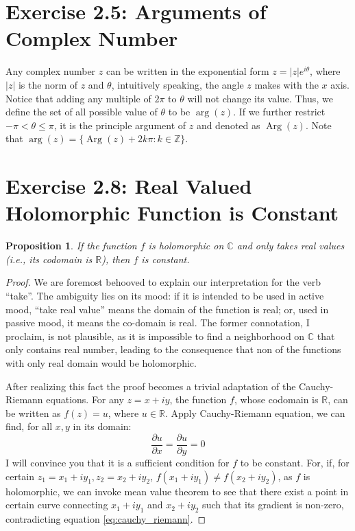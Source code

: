 \documentclass[a4paper,11pt]{article}
\newtheorem{prop}{Proposition}
\DeclareMathOperator{\Arg}{Arg} %
\begin{document}
\section*{Exercise 2.5: Arguments of Complex Number}

Any complex number $z$ can be written in the exponential form $z = |z|e^{i\theta}$, where $|z|$ is the norm of $z$ and $\theta$, intuitively speaking, the angle $z$ makes with the $x$ axis.
Notice that adding any multiple of $2\pi$ to $\theta$ will not change its value. Thus, we define the set of all possible value of $\theta$ to be $\arg(z)$. If we further restrict $-\pi<\theta \leq \pi$, it is the principle argument of $z$ and denoted as $\Arg(z)$. Note that $\arg(z) = \{\Arg(z) + 2k\pi : k \in \mathbb{Z}\}$.

\section*{Exercise 2.8: Real Valued Holomorphic Function is Constant}

\begin{prop}
	If the function $f$ is holomorphic on $\mathbb{C}$ and only takes real values (i.e., its codomain is $\mathbb{R}$), then $f$ is constant.
\end{prop}

\begin{proof}
	We are foremost behooved to explain our interpretation for the verb ``take''.
	The ambiguity lies on its mood: if it is intended to be used in active mood, ``take real value'' means the domain of the function is real; or, used in passive mood, it means the co-domain is real. The former connotation, I proclaim, is not plausible, as it is impossible to find a neighborhood on $\mathbb{C}$ that only contains real number, leading to the consequence that non of the functions with only real domain would be holomorphic.

	After realizing this fact the proof becomes a trivial adaptation of the Cauchy-Riemann equations. 
	For any $z = x + iy$, the function $f$, whose codomain is $\mathbb{R}$, can be written as $f(z) = u$, where $u \in \mathbb{R}$.
	Apply Cauchy-Riemann equation, we can find, for all $x, y$ in its domain: 
	\begin{equation}\label{eq:cauchy_riemann}
		\frac{\partial u}{\partial x} = \frac{\partial u}{\partial y} = 0
	\end{equation}
	I will convince you that it is a sufficient condition for $f$ to be constant.
	For, if, for certain $z_1 = x_1+iy_1, z_2 = x_2+iy_2$, $f(x_1 + iy_1) \neq f(x_2 + iy_2)$, as $f$ is holomorphic, we can invoke mean value theorem to see that there exist a point in certain curve connecting $x_1 + iy_1$ and $x_2+iy_2$ such that its gradient is non-zero, contradicting equation \ref{eq:cauchy_riemann}.
\end{proof}
\end{document}
